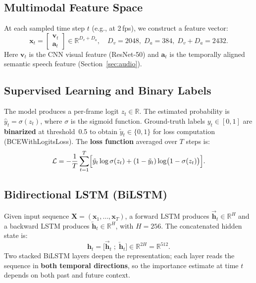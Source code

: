 \documentclass[10pt,conference]{IEEEtran}
\begin{document}
\subsection{Multimodal Feature Space}

At each sampled time step $t$ (e.g., at 2\,fps), we construct a feature
vector:
\begin{equation}
  \mathbf{x}_t =
  \begin{bmatrix}
    \mathbf{v}_t \\ \mathbf{a}_t
  \end{bmatrix}
  \in \mathbb{R}^{D_v + D_a},
  \quad D_v = 2048,\; D_a = 384,\; D_v + D_a = 2432.
\end{equation}
Here $\mathbf{v}_t$ is the CNN visual feature (ResNet-50) and $\mathbf{a}_t$
is the temporally aligned semantic speech feature (Section~\ref{sec:audio}).

\subsection{Supervised Learning and Binary Labels}

The model produces a per-frame logit $z_t \in \mathbb{R}$. The estimated
probability is $\hat{y}_t = \sigma(z_t)$, where $\sigma$ is the sigmoid
function. Ground-truth labels $y_t \in [0,1]$ are \textbf{binarized} at
threshold~0.5 to obtain $\tilde{y}_t \in \{0,1\}$ for loss computation
(BCEWithLogitsLoss). The \textbf{loss function} averaged over $T$ steps is:
\begin{equation}
  \mathcal{L}
  = -\frac{1}{T}\sum_{t=1}^{T}
  \Bigl[
    \tilde{y}_t \log \sigma(z_t)
    + (1 - \tilde{y}_t)\log\bigl(1 - \sigma(z_t)\bigr)
  \Bigr].
  \label{eq:bce}
\end{equation}

\subsection{Bidirectional LSTM (BiLSTM)}

Given input sequence $\mathbf{X} = (\mathbf{x}_1,\dots,\mathbf{x}_T)$, a
forward LSTM produces $\overrightarrow{\mathbf{h}}_t \in \mathbb{R}^{H}$ and a
backward LSTM produces $\overleftarrow{\mathbf{h}}_t \in \mathbb{R}^{H}$,
with $H = 256$. The concatenated hidden state is:
\begin{equation}
  \mathbf{h}_t = \bigl[\overrightarrow{\mathbf{h}}_t \;;\;
                       \overleftarrow{\mathbf{h}}_t\bigr]
               \in \mathbb{R}^{2H} = \mathbb{R}^{512}.
\end{equation}
Two stacked BiLSTM layers deepen the representation; each layer reads the
sequence in \textbf{both temporal directions}, so the importance estimate at
time $t$ depends on both past and future context.
\end{document}
